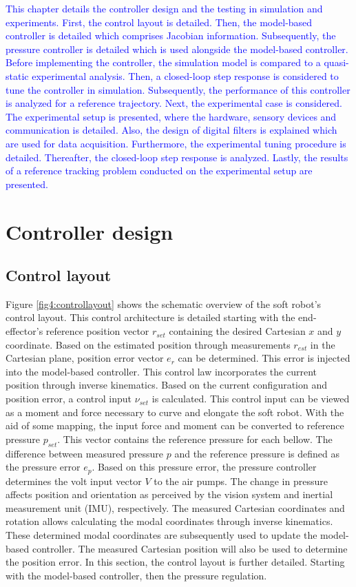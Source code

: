 \label{chap4a}

\textcolor{blue}{This chapter details the controller design and the testing in simulation and experiments. First, the control layout is detailed. Then, the model-based controller is detailed which comprises Jacobian information. Subsequently, the pressure controller is detailed which is used alongside the model-based controller. Before implementing the controller, the simulation model is compared to a quasi-static experimental analysis. Then, a closed-loop step response is considered to tune the controller in simulation. Subsequently, the performance of this controller is analyzed for a reference trajectory. Next, the experimental case is considered. The experimental setup is presented, where the hardware, sensory devices and communication is detailed. Also, the design of digital filters is explained which are used for data acquisition. Furthermore, the experimental tuning procedure is detailed. Thereafter, the closed-loop step response is analyzed. Lastly, the results of a reference tracking problem conducted on the experimental setup are presented.}



\section{Controller design}


\subsection{Control layout}

Figure \ref{fig4:controllayout} shows the schematic overview of the soft robot's control layout. This control architecture is detailed starting with the end-effector's reference position vector $r_{set}$ containing the desired Cartesian $x$ and $y$ coordinate. Based on the estimated position through measurements $r_{est}$ in the Cartesian plane, position error vector $e_r$ can be determined. This error is injected into the model-based controller. This control law incorporates the current position through inverse kinematics. Based on the current configuration and position error, a control input $\nu_{set}$ is calculated. This control input can be viewed as a moment and force necessary to curve and elongate the soft robot. With the aid of some mapping, the input force and moment can be converted to reference pressure $p_{set}$. This vector contains the reference pressure for each bellow. The difference between measured pressure $p$ and the reference pressure is defined as the pressure error $e_p$. Based on this pressure error, the pressure controller determines the volt input vector $V$ to the air pumps. The change in pressure affects position and orientation as perceived by the vision system and inertial measurement unit (IMU), respectively. The measured Cartesian coordinates and rotation allows calculating the modal coordinates through inverse kinematics. These determined modal coordinates are subsequently used to update the model-based controller. The measured Cartesian position will also be used to determine the position error. In this section, the control layout is further detailed. Starting with the model-based controller, then the pressure regulation.


